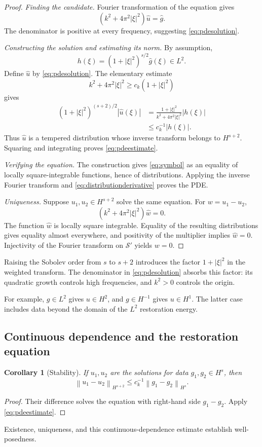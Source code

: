 \documentclass[11pt]{article}
\numberwithin{equation}{section}
\newtheorem{corollary}[theorem]{Corollary}
\theoremstyle{definition}
\theoremstyle{remark}
\newcommand{\Sch}{\mathcal S}
\newcommand{\norm}[1]{\left\|#1\right\|}
\newcommand{\wh}[1]{\widehat{#1}}
\begin{document}
\begin{proof}
\emph{Finding the candidate.} Fourier transformation of the equation gives
\begin{equation}\label{eq:symbol}
 (k^2+4\pi^2|\xi|^2)\wh u=\wh g.
\end{equation}
The denominator is positive at every frequency, suggesting \eqref{eq:pdesolution}.

\emph{Constructing the solution and estimating its norm.} By assumption,
\[
 h(\xi)=(1+|\xi|^2)^{s/2}\wh g(\xi)\in L^2.
\]
Define \(\wh u\) by \eqref{eq:pdesolution}. The elementary estimate
\begin{equation}\label{eq:denominatorbound}
 k^2+4\pi^2|\xi|^2\ge c_k(1+|\xi|^2)
\end{equation}
gives
\begin{align*}
 (1+|\xi|^2)^{(s+2)/2}|\wh u(\xi)|
 &=\frac{1+|\xi|^2}{k^2+4\pi^2|\xi|^2}|h(\xi)|\\
 &\le c_k^{-1}|h(\xi)|.
\end{align*}
Thus \(\wh u\) is a tempered distribution whose inverse transform belongs to \(H^{s+2}\). Squaring and integrating proves \eqref{eq:pdeestimate}.

\emph{Verifying the equation.} The construction gives \eqref{eq:symbol} as an equality of locally square-integrable functions, hence of distributions. Applying the inverse Fourier transform and \eqref{eq:distributionderivative} proves the PDE.

\emph{Uniqueness.} Suppose \(u_1,u_2\in H^{s+2}\) solve the same equation. For \(w=u_1-u_2\),
\[
 (k^2+4\pi^2|\xi|^2)\wh w=0.
\]
The function \(\wh w\) is locally square integrable. Equality of the resulting distributions gives equality almost everywhere, and positivity of the multiplier implies \(\wh w=0\). Injectivity of the Fourier transform on \(\Sch'\) yields \(w=0\).
\end{proof}

Raising the Sobolev order from \(s\) to \(s+2\) introduces the factor \(1+|\xi|^2\) in the weighted transform. The denominator in \eqref{eq:pdesolution} absorbs this factor: its quadratic growth controls high frequencies, and \(k^2>0\) controls the origin.

For example, \(g\in L^2\) gives \(u\in H^2\), and \(g\in H^{-1}\) gives \(u\in H^1\). The latter case includes data beyond the domain of the \(L^2\) restoration energy.

\subsection{Continuous dependence and the restoration equation}
\begin{corollary}[Stability]
If \(u_1,u_2\) are the solutions for data \(g_1,g_2\in H^s\), then
\[
 \norm{u_1-u_2}_{H^{s+2}}
       \le c_k^{-1}\norm{g_1-g_2}_{H^s}.
\]
\end{corollary}
\begin{proof}
Their difference solves the equation with right-hand side \(g_1-g_2\). Apply \eqref{eq:pdeestimate}.
\end{proof}
Existence, uniqueness, and this continuous-dependence estimate establish well-posedness.
\end{document}
